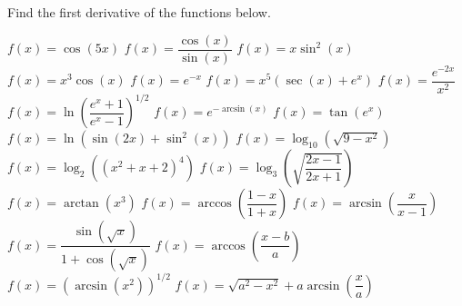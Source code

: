 \begin{Exercise} Find the first derivative of the functions below. 
	\begin{multicols}{2}
	\ifcalculus\Question[difficulty = 1] $f(x)=\cos(5x)$
	\Question[difficulty = 1] $f(x)=\dfrac{\cos(x)}{\sin(x)}$\fi
	\Question[difficulty = 1] $ f(x)=x\sin^2(x) $
	\Question[difficulty = 1] $f(x)=x^3 \cos (x) $
	\ifcalculus\Question[difficulty = 1] $f(x)=e^{-x}$\fi
	\Question[difficulty = 1] $f(x)= x^5 \left( \sec(x) + e^x \right)$
	\Question[difficulty = 1] $f(x)=\dfrac{e^{-2x}}{x^2}$
    \Question[difficulty = 2] $f(x)=\ln \left( \dfrac{e^{x}+1}{e^x-1} \right)^{1/2}$
	\Question[difficulty = 1] $f(x) = e^{- \arcsin (x)}$
	\Question[difficulty = 1] $f(x) = \tan (e^x)$
	\ifcalculus \Question[difficulty = 2] $f(x) = \ln \left( \sin(2x) + \sin^2(x) \right)$ \fi
	\ifanalysis\Question[difficulty = 1]\fi\ifcalculus\Question[difficulty = 2]\fi $f(x) = \log_{10} \left(\sqrt{9-x^2}\right)$
	\ifanalysis\Question[difficulty = 1]\fi\ifcalculus\Question[difficulty = 2]\fi $f(x) = \log_{2} \left( (x^2+x+2)^4 \right)$
	\Question[difficulty = 2] $f(x) = \log_{3}\left(\sqrt{\dfrac{2x-1}{2x+1}}\right)$
	\ifcalculus \Question[difficulty = 1] $f(x) = \arctan\left(x^3\right)$ 
	\Question[difficulty = 2] $f(x) = \arccos\left(\dfrac{1-x}{1+x}\right)$\fi
	\ifanalysis\Question[difficulty = 1]\fi\ifcalculus\Question[difficulty = 2]\fi $f(x)=\arcsin \left( \dfrac{x}{x-1}\right) $
		\ifanalysis\Question[difficulty = 1]\fi\ifcalculus\Question[difficulty = 2]\fi $f(x) = \dfrac{\sin\left( \sqrt{x}\right)}{1 + \cos \left(\sqrt{x}\right)}$ 
	\Question[difficulty = 1] $f(x) = \arccos\left(\dfrac{x-b}{a}\right)$ 
	\ifanalysis\Question[difficulty = 1]\fi\ifcalculus\Question[difficulty = 2]\fi $f(x) = \left( \arcsin (x^2) \right)^{1/2}$ 
	\Question[difficulty = 1] $f(x) = \sqrt{a^2-x^2} +a\arcsin\left(\dfrac{x}{a}\right)$ 
	\EndCurrentQuestion
	\end{multicols}

\end{Exercise}

